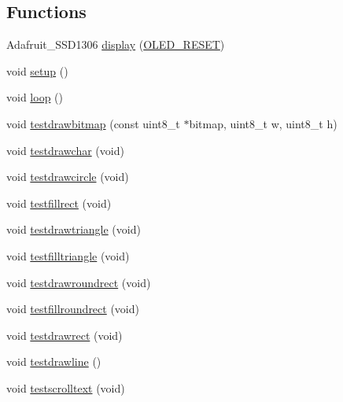 \subsection*{Functions}
\begin{DoxyCompactItemize}
\item 
Adafruit\-\_\-\-S\-S\-D1306 \hyperlink{ssd1306__128x64__i2c_8ino_a602b274cb9cc9cc97e2141c4715da23a}{display} (\hyperlink{ssd1306__128x64__i2c_8ino_a619e07239fb3b9b14d40646ab41d5b4f}{O\-L\-E\-D\-\_\-\-R\-E\-S\-E\-T})
\item 
void \hyperlink{ssd1306__128x64__i2c_8ino_a4fc01d736fe50cf5b977f755b675f11d}{setup} ()
\item 
void \hyperlink{ssd1306__128x64__i2c_8ino_afe461d27b9c48d5921c00d521181f12f}{loop} ()
\item 
void \hyperlink{ssd1306__128x64__i2c_8ino_a1d1b887b3eb825222c24177a3dbe5f67}{testdrawbitmap} (const uint8\-\_\-t $\ast$bitmap, uint8\-\_\-t w, uint8\-\_\-t h)
\item 
void \hyperlink{ssd1306__128x64__i2c_8ino_adfa75365c313918e3b3ed6227de18569}{testdrawchar} (void)
\item 
void \hyperlink{ssd1306__128x64__i2c_8ino_a9f0228fb5e42403debdf8b8e56eec006}{testdrawcircle} (void)
\item 
void \hyperlink{ssd1306__128x64__i2c_8ino_a9c3d9731291f48e03f399b9be384eac7}{testfillrect} (void)
\item 
void \hyperlink{ssd1306__128x64__i2c_8ino_a7d6f833e28203ab647d2a32fcf34403a}{testdrawtriangle} (void)
\item 
void \hyperlink{ssd1306__128x64__i2c_8ino_a911f1cdd366d483984acd5ba4fae9f93}{testfilltriangle} (void)
\item 
void \hyperlink{ssd1306__128x64__i2c_8ino_a3a5e98481e176f5fecbf531e326c4ad0}{testdrawroundrect} (void)
\item 
void \hyperlink{ssd1306__128x64__i2c_8ino_ac4bdf8920a5bda66553308a5639bbdd6}{testfillroundrect} (void)
\item 
void \hyperlink{ssd1306__128x64__i2c_8ino_af10af010a59efb8e48bcc38f6585c3e2}{testdrawrect} (void)
\item 
void \hyperlink{ssd1306__128x64__i2c_8ino_a339c7cdabcdae713a6be0ea3fba5e88b}{testdrawline} ()
\item 
void \hyperlink{ssd1306__128x64__i2c_8ino_a42236c4349117bcbcf43ec2818ca7377}{testscrolltext} (void)
\end{DoxyCompactItemize}


